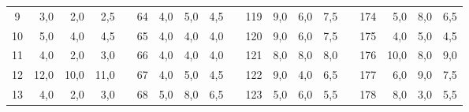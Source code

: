 \begin{table}[H]
{\begin{tabular}{|c|r|r|r|l|c|r|r|r|l|c|r|r|r|lcrrr}
9                                                     & 3,0                                                                       & 2,0                                                                       & 2,5                                                                       &  & 64  & 4,0  & 5,0  & 4,5  &  & 119 & 9,0  & 6,0  & 7,5  & \multicolumn{1}{l|}{} & \multicolumn{1}{c|}{174} & \multicolumn{1}{r|}{5,0}  & \multicolumn{1}{r|}{8,0}  & \multicolumn{1}{r|}{6,5}  \\ \cline{1-4} \cline{6-9} \cline{11-14} \cline{16-19} 
10                                                    & 5,0                                                                       & 4,0                                                                       & 4,5                                                                       &  & 65  & 4,0  & 4,0  & 4,0  &  & 120 & 9,0  & 6,0  & 7,5  & \multicolumn{1}{l|}{} & \multicolumn{1}{c|}{175} & \multicolumn{1}{r|}{4,0}  & \multicolumn{1}{r|}{5,0}  & \multicolumn{1}{r|}{4,5}  \\ \cline{1-4} \cline{6-9} \cline{11-14} \cline{16-19} 
11                                                    & 4,0                                                                       & 2,0                                                                       & 3,0                                                                       &  & 66  & 4,0  & 4,0  & 4,0  &  & 121 & 8,0  & 8,0  & 8,0  & \multicolumn{1}{l|}{} & \multicolumn{1}{c|}{176} & \multicolumn{1}{r|}{10,0} & \multicolumn{1}{r|}{8,0}  & \multicolumn{1}{r|}{9,0}  \\ \cline{1-4} \cline{6-9} \cline{11-14} \cline{16-19} 
12                                                    & 12,0                                                                      & 10,0                                                                      & 11,0                                                                      &  & 67  & 4,0  & 5,0  & 4,5  &  & 122 & 9,0  & 4,0  & 6,5  & \multicolumn{1}{l|}{} & \multicolumn{1}{c|}{177} & \multicolumn{1}{r|}{6,0}  & \multicolumn{1}{r|}{9,0}  & \multicolumn{1}{r|}{7,5}  \\ \cline{1-4} \cline{6-9} \cline{11-14} \cline{16-19} 
13                                                    & 4,0                                                                       & 2,0                                                                       & 3,0                                                                       &  & 68  & 5,0  & 8,0  & 6,5  &  & 123 & 5,0  & 6,0  & 5,5  & \multicolumn{1}{l|}{} & \multicolumn{1}{c|}{178} & \multicolumn{1}{r|}{8,0}  & \multicolumn{1}{r|}{3,0}  & \multicolumn{1}{r|}{5,5}  \\ \cline{1-4} \cline{6-9} \cline{11-14} \cline{16-19} 

\end{tabular}}
\end{table}
